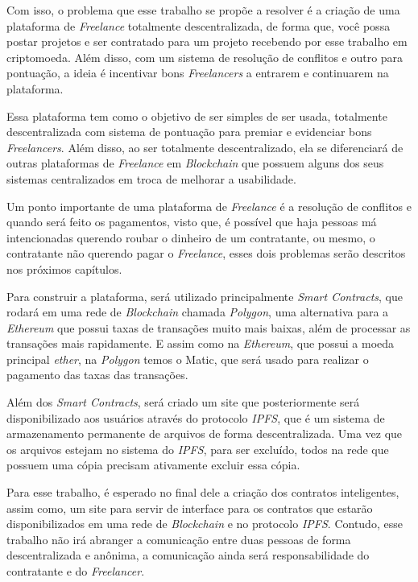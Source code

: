 Com isso, o problema que esse trabalho se propõe a resolver é a criação de uma plataforma de \textit{Freelance} totalmente descentralizada, de forma que, você possa postar projetos e ser contratado para um projeto recebendo por esse trabalho em criptomoeda. Além disso, com um sistema de resolução de conflitos e outro para pontuação, a ideia é incentivar bons \textit{Freelancers} a entrarem e continuarem na plataforma.

Essa plataforma tem como o objetivo de ser simples de ser usada, totalmente descentralizada com sistema de pontuação para premiar e evidenciar bons \textit{Freelancers}. Além disso, ao ser totalmente descentralizado, ela se diferenciará de outras plataformas de \textit{Freelance} em \textit{Blockchain} que possuem alguns dos seus sistemas centralizados em troca de melhorar a usabilidade.

Um ponto importante de uma plataforma de \textit{Freelance} é a resolução de conflitos e quando será feito os pagamentos, visto que, é possível que haja pessoas má intencionadas querendo roubar o dinheiro de um contratante, ou mesmo, o contratante não querendo pagar o \textit{Freelance}, esses dois problemas serão descritos nos próximos capítulos.

Para construir a plataforma, será utilizado principalmente \textit{Smart Contracts}, que rodará em uma rede de \textit{Blockchain} chamada \textit{Polygon}, uma alternativa para a \textit{Ethereum} que possui taxas de transações muito mais baixas, além de processar as transações mais rapidamente. E assim como na \textit{Ethereum}, que possui a moeda principal \textit{ether}, na \textit{Polygon} temos o Matic, que será usado para realizar o pagamento das taxas das transações.\cite{polygon}

Além dos \textit{Smart Contracts}, será criado um site que posteriormente será disponibilizado aos usuários através do protocolo \textit{IPFS}, que é um sistema de armazenamento permanente de arquivos de forma descentralizada. Uma vez que os arquivos estejam no sistema do \textit{IPFS}, para ser excluído, todos na rede que possuem uma cópia precisam ativamente excluir essa cópia.\cite{ipfs}

Para esse trabalho, é esperado no final dele a criação dos contratos inteligentes, assim como, um site para servir de interface para os contratos que estarão disponibilizados em uma rede de \textit{Blockchain} e no protocolo \textit{IPFS}. Contudo, esse trabalho não irá abranger a comunicação entre duas pessoas de forma descentralizada e anônima, a comunicação ainda será responsabilidade do contratante e do \textit{Freelancer}.


